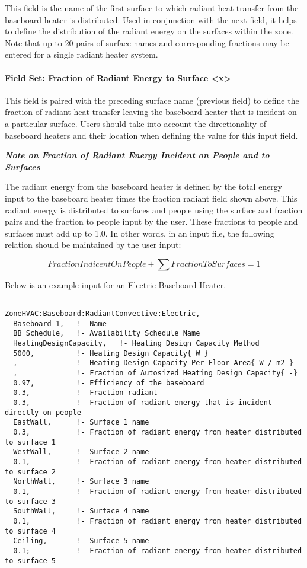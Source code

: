 This field is the name of the first surface to which radiant heat transfer from the baseboard heater is distributed. Used in conjunction with the next field, it helps to define the distribution of the radiant energy on the surfaces within the zone. Note that up to 20 pairs of surface names and corresponding fractions may be entered for a single radiant heater system.

\paragraph{Field Set: Fraction of Radiant Energy to Surface \textless{}x\textgreater{}}\label{field-set-fraction-of-radiant-energy-to-surface-x}

This field is paired with the preceding surface name (previous field) to define the fraction of radiant heat transfer leaving the baseboard heater that is incident on a particular surface. Users should take into account the directionality of baseboard heaters and their location when defining the value for this input field.

\textbf{\emph{Note on Fraction of Radiant Energy Incident on \hyperref[people]{People} and to Surfaces}}

The radiant energy from the baseboard heater is defined by the total energy input to the baseboard heater times the fraction radiant field shown above. This radiant energy is distributed to surfaces and people using the surface and fraction pairs and the fraction to people input by the user. These fractions to people and surfaces must add up to 1.0. In other words, in an input file, the following relation should be maintained by the user input:

\begin{equation}
FractionIndicentOnPeople + \sum {FractionToSurfaces = 1}
\end{equation}

Below is an example input for an Electric Baseboard Heater.

\begin{lstlisting}

ZoneHVAC:Baseboard:RadiantConvective:Electric,
  Baseboard 1,   !- Name
  BB Schedule,   !- Availability Schedule Name
  HeatingDesignCapacity,   !- Heating Design Capacity Method
  5000,          !- Heating Design Capacity{ W }
  ,              !- Heating Design Capacity Per Floor Area{ W / m2 }
  ,              !- Fraction of Autosized Heating Design Capacity{ -}
  0.97,          !- Efficiency of the baseboard
  0.3,           !- Fraction radiant
  0.3,           !- Fraction of radiant energy that is incident directly on people
  EastWall,      !- Surface 1 name
  0.3,           !- Fraction of radiant energy from heater distributed to surface 1
  WestWall,      !- Surface 2 name
  0.1,           !- Fraction of radiant energy from heater distributed to surface 2
  NorthWall,     !- Surface 3 name
  0.1,           !- Fraction of radiant energy from heater distributed to surface 3
  SouthWall,     !- Surface 4 name
  0.1,           !- Fraction of radiant energy from heater distributed to surface 4
  Ceiling,       !- Surface 5 name
  0.1;           !- Fraction of radiant energy from heater distributed to surface 5
\end{lstlisting}

